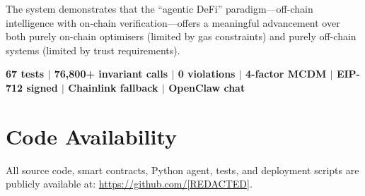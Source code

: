 \documentclass[12pt]{article}
\begin{document}
The system demonstrates that the ``agentic DeFi'' paradigm---off-chain intelligence with on-chain verification---offers a meaningful advancement over both purely on-chain optimisers (limited by gas constraints) and purely off-chain systems (limited by trust requirements).

\medskip
\noindent\textbf{67 tests $\mid$ 76{,}800+ invariant calls $\mid$ 0 violations $\mid$ 4-factor MCDM $\mid$ EIP-712 signed $\mid$ Chainlink fallback $\mid$ OpenClaw chat}


\section*{Code Availability}

All source code, smart contracts, Python agent, tests, and deployment scripts are publicly available at: \url{https://github.com/[REDACTED]}.

\bigskip

\begingroup
\renewcommand{\section}[2]{}  %
\end{document}
